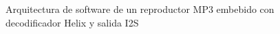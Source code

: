 \documentclass[pdflatex,sn-mathphys-num]{sn-jnl}%
\begin{document}

\begin{figure}[!h]
    \centering
    \caption{Arquitectura de software de un reproductor MP3 embebido con decodificador Helix y salida I2S}
    \label{fig:software_architecture}
\end{figure}
\end{document}
